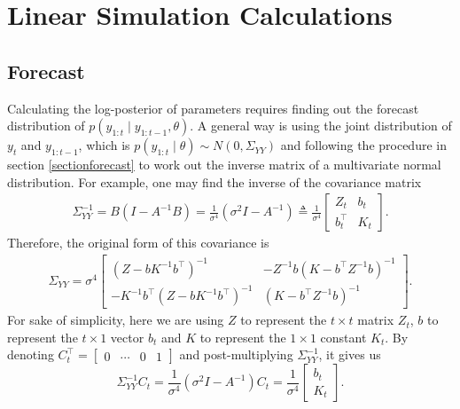 \setcounter{figure}{1} 

\section{Linear Simulation Calculations}\label{linearcalculation}

\subsection*{Forecast} 

Calculating the log-posterior of parameters requires finding out the forecast distribution of $p(y_{1:t}\mid y_{1:t-1},\theta)$. A general way is using the joint distribution of $y_{t}$ and $y_{1:t-1}$, which is $p(y_{1:t}\mid \theta)\sim N(0,\Sigma_{YY})$ and following the procedure in section \ref{sectionforecast} to work out the inverse matrix of a multivariate normal distribution. For example, one may find the inverse of the covariance matrix 
\begin{align*}
\Sigma_{YY}^{-1} = B(I-A^{-1}B) =\frac{1}{\sigma^4}(\sigma^2 I-A^{-1}) \triangleq \frac{1}{\sigma^4} \left[\begin{matrix} 
Z_{t} & b_{t} \\
b_{t}^\top & K_{t}
\end{matrix} \right].
\end{align*}
Therefore, the original form of this covariance is 
\begin{align*} \Sigma_{YY} =\sigma^4 \left[ \begin{matrix}
(Z-bK^{-1}b^\top)^{-1} & -Z^{-1}b(K-b^\top Z^{-1}b)^{-1}\\
-K^{-1}b^\top (Z-bK^{-1}b^\top)^{-1} & (K-b^\top Z^{-1}b)^{-1}
\end{matrix}\right].
\end{align*}
For sake of simplicity, here we are using $Z$ to represent the $t\times t$ matrix $Z_{t}$, $b$ to represent the $t \times 1$ vector  $b_{t}$  and $K$ to represent the $1\times 1$ constant $K_{t}$. By denoting $C_{t}^\top = \begin{bmatrix} 0 & \cdots & 0 & 1\end{bmatrix}$ and post-multiplying $\Sigma_{YY}^{-1}$, it gives us 
\begin{equation}
\Sigma_{YY}^{-1} C_{t}= \frac{1}{\sigma^4}(\sigma^2 I-A^{-1}) C_{t}= \frac{1}{\sigma^4} \left[\begin{matrix} b_{t} \\ K_{t} \end{matrix} \right].
\end{equation} 

